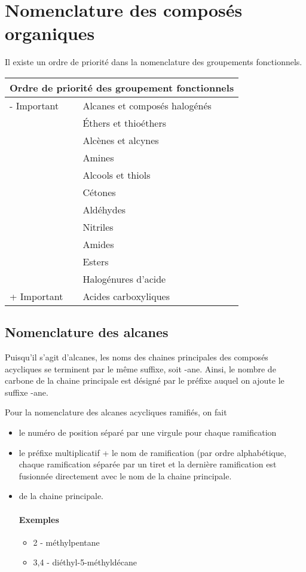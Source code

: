 \section{Nomenclature des composés organiques}

Il existe un ordre de priorité dans la nomenclature des groupements fonctionnels.

\begin{tabular}{|l | l|}
  \hline
  \multicolumn{2}{|c|}{Ordre de priorité des groupement fonctionnels}\\
  \hline
  - Important & Alcanes et composés halogénés \\
              &   \'Ethers et thioéthers\\
              & Alcènes et alcynes \\
              & Amines \\
              & Alcools et thiols \\
              & Cétones \\
              & Aldéhydes \\
              & Nitriles \\
              & Amides \\
              & Esters \\
              & Halogénures d'acide \\
  + Important & Acides carboxyliques \\

  \hline
\end{tabular}



\subsection{Nomenclature des alcanes}
Puisqu'il s'agit d'alcanes, les noms des chaines principales des composés acycliques se terminent par le même suffixe, soit -ane.
Ainsi, le nombre de carbone de la chaine principale est désigné par le préfixe auquel on ajoute le suffixe -ane.

Pour la nomenclature des alcanes acycliques ramifiés, on fait
\begin{itemize}
  \item le numéro de position séparé par une virgule pour chaque ramification
  \item le préfixe multiplicatif + le nom de ramification (par ordre alphabétique, chaque ramification séparée par un tiret et la dernière ramification est fusionnée directement avec le nom de la chaine principale.
  \item de la chaine principale.

    \paragraph{Exemples }
    \begin{itemize}
      \item 2 - méthylpentane
      \item 3,4 - diéthyl-5-méthyldécane
    \end{itemize}
\end{itemize}

